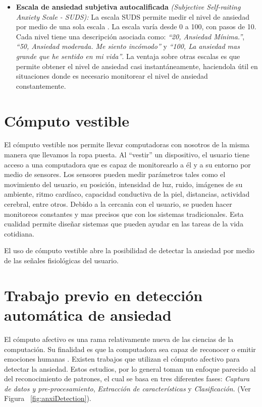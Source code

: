 \begin{itemize}
		\item \textbf{Escala de ansiedad subjetiva autocalificada} \textit{(Subjective Self-raiting Anxiety Scale - SUDS):}
			La escala SUDS permite medir el nivel de ansiedad por medio de una sola escala \citep{wolpe1973practice}. La escala var\'ia desde 0 a 100, con pasos de 10. Cada nivel tiene una descripci\'on asociada como: \textit{``20, Ansiedad M\'inima.''}, \textit{``50, Ansiedad moderada. Me siento inc\'omodo''} y \textit{``100, La ansiedad mas grande que he sentido en mi vida''}. La ventaja sobre otras escalas es que permite obtener el nivel de ansiedad casi instant\'aneamente, haciendola \'util en situaciones donde es necesario monitorear el nivel de ansiedad constantemente.
        \end{itemize}


\section{C\'omputo vestible}\label{secc:dementia}
El c\'omputo vestible nos permite llevar computadoras con nosotros de la misma manera que llevamos la ropa puesta. Al ``vestir'' un dispositivo, el usuario tiene acceso a una computadora que es capaz de monitorearlo a \'el y a su entorno por medio de sensores. Los sensores pueden medir par\'ametros tales como el movimiento del usuario, su posici\'on, intensidad de luz, ruido, im\'agenes de su ambiente, ritmo card\'iaco, capacidad conductiva de la piel, distancias, actividad cerebral, entre otros. Debido a la cercania con el usuario, se pueden hacer monitoreos constantes y mas precisos que con los sistemas tradicionales. Esta cualidad permite dise\~nar sistemas que pueden ayudar en las tareas de la vida cotidiana.

El uso de c\'omputo vestible abre la posibilidad de detectar la ansiedad por medio de las se\~nales fisiol\'ogicas del usuario.

\section{Trabajo previo en detecci\'on autom\'atica de ansiedad}
El c\'omputo afectivo es una rama relativamente nueva de las ciencias de la computaci\'on. Su finalidad es que la computadora sea capaz de reconocer o emitir emociones humanas \citep{picard1997affective}. Existen trabajos que utilizan el c\'omputo afectivo para detectar la ansiedad. Estos estudios, por lo general toman un enfoque parecido al del reconocimiento de patrones, el cual se basa en tres diferentes fases: \textit{Captura de datos y pre-procesamiento}, \textit{Extracci\'on de caracter\'isticas} y \textit{Clasificaci\'on}. (Ver Figura ~\ref{fig:anxiDetection}). 

